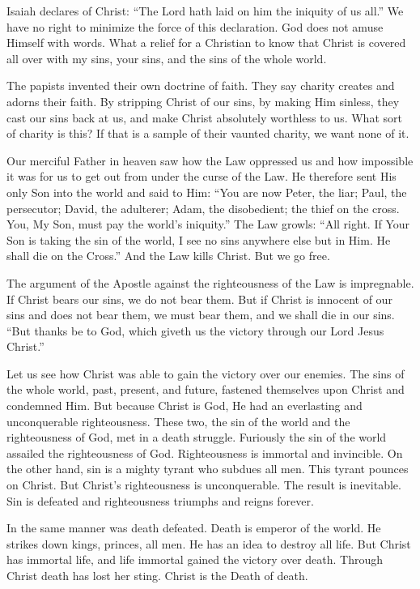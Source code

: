 Isaiah declares of Christ: “The Lord hath laid on him the iniquity of us all.” We have no right to minimize the force of this declaration. God does not amuse Himself with words. What a relief for a Christian to know that Christ is covered all over with my sins, your sins, and the sins of the whole world.

The papists invented their own doctrine of faith. They say charity creates and adorns their faith. By stripping Christ of our sins, by making Him sinless, they cast our sins back at us, and make Christ absolutely worthless to us. What sort of charity is this? If that is a sample of their vaunted charity, we want none of it.

Our merciful Father in heaven saw how the Law oppressed us and how impossible it was for us to get out from under the curse of the Law. He therefore sent His only Son into the world and said to Him: “You are now Peter, the liar; Paul, the persecutor; David, the adulterer; Adam, the disobedient; the thief on the cross. You, My Son, must pay the world’s iniquity.” The Law growls: “All right. If Your Son is taking the sin of the world, I see no sins anywhere else but in Him. He shall die on the Cross.” And the Law kills Christ. But we go free.

The argument of the Apostle against the righteousness of the Law is impregnable. If Christ bears our sins, we do not bear them. But if Christ is innocent of our sins and does not bear them, we must bear them, and we shall die in our sins. “But thanks be to God, which giveth us the victory through our Lord Jesus Christ.”

Let us see how Christ was able to gain the victory over our enemies. The sins of the whole world, past, present, and future, fastened themselves upon Christ and condemned Him. But because Christ is God, He had an everlasting and unconquerable righteousness. These two, the sin of the world and the righteousness of God, met in a death struggle. Furiously the sin of the world assailed the righteousness of God. Righteousness is immortal and invincible. On the other hand, sin is a mighty tyrant who subdues all men. This tyrant pounces on Christ. But Christ’s righteousness is unconquerable. The result is inevitable. Sin is defeated and righteousness triumphs and reigns forever.

In the same manner was death defeated. Death is emperor of the world. He strikes down kings, princes, all men. He has an idea to destroy all life. But Christ has immortal life, and life immortal gained the victory over death. Through Christ death has lost her sting. Christ is the Death of death.

